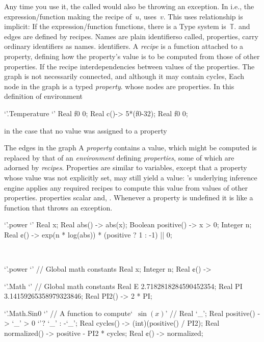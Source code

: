 Any time you use it, the called would also be throwing an exception.
In i.e., the expression/function
making the
recipe of~$u$, uses~$v$. This uses relationship is implicit: If the
expression/function
functions,
there is a
Type system is~$𝕋$.
and edges are defined by recipes. Names are plain
identifierso called,
properties, carry ordinary identifiers as names.
identifiers.
A \emph{recipe}
is a function attached to a property, defining how the property's value
is to be computed from those of other properties. If the recipe
interdependencies between values
of the properties. The graph is not necessarily connected, and although it may
contain cycles,
Each node in the graph is a typed
\emph{property}. whose nodes are properties.
In this definition of environment~
\begin{reap}
  `'.Temperature {`'
    Real f0 0;
    Real c()-> 5*(f0-32);
    Real f0 0;
  }
\end{reap}
in the case that no value was assigned to a property
\begin{reap} \end{reap}
The edges in the graph
A \emph{property}
contains a value, which might be computed
is replaced by that of an \emph{environment} defining \emph{properties}, some
of which are adorned by \emph{recipes}. Properties are similar to variables,
except that a property whose value was not explicitly set, may still yield a
value: \Reap's underlying inference engine applies any required recipes to
compute this value from values of other properties.
properties scalar
and,
.
Whenever a property is undefined it is like a function that throws an exception.
\begin{reap}
  `'.power {`'
    Real x;
    Real abs() -> abs(x);
    Boolean positive() -> x > 0;
    Integer n;
    Real ¢() -> exp(n * log(abs)) * (positive ? 1 : -1) || 0;
  }
\end{reap}
\
\begin{reap}
  `'.power {`' // Global math constants
    Real x;
    Integer n;
    Real ¢() ->
  }
\end{reap}
\begin{reap}
  `'.Math {`' // Global math constants
    Real E 2.7182818284590452354;
    Real PI 3.14159265358979323846;
    Real PI2() -> 2 * PI;
  }
\end{reap}
\begin{reap}
  `'.Math.Sin0 {`' // A function to compute`~$\sin(x)$' //
    Real `\_';
    Real positive() -> `\_' > 0 `'? `\_' : -`\_';
    Real cycles() -> (int)(positive() / PI2);
    Real normalized() -> positive - PI2 * cycles;
    Real ¢() -> normalized;
  }
\end{reap}

